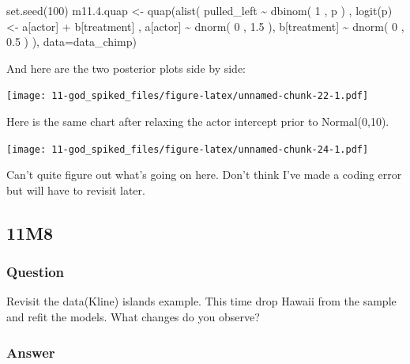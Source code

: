 \documentclass[
]{book}
\newenvironment{Shaded}{\begin{snugshade}}{\end{snugshade}}
\newcommand{\AttributeTok}[1]{\textcolor[rgb]{0.77,0.63,0.00}{#1}}
\newcommand{\DecValTok}[1]{\textcolor[rgb]{0.00,0.00,0.81}{#1}}
\newcommand{\FloatTok}[1]{\textcolor[rgb]{0.00,0.00,0.81}{#1}}
\newcommand{\FunctionTok}[1]{\textcolor[rgb]{0.00,0.00,0.00}{#1}}
\newcommand{\NormalTok}[1]{#1}
\newcommand{\OtherTok}[1]{\textcolor[rgb]{0.56,0.35,0.01}{#1}}
\newcommand{\SpecialCharTok}[1]{\textcolor[rgb]{0.00,0.00,0.00}{#1}}
\begin{document}
\begin{Shaded}
\begin{Highlighting}[]
\FunctionTok{set.seed}\NormalTok{(}\DecValTok{100}\NormalTok{)}
\NormalTok{m11.}\FloatTok{4.}\NormalTok{quap }\OtherTok{\textless{}{-}} \FunctionTok{quap}\NormalTok{(}\FunctionTok{alist}\NormalTok{( }
\NormalTok{  pulled\_left }\SpecialCharTok{\textasciitilde{}} \FunctionTok{dbinom}\NormalTok{( }\DecValTok{1}\NormalTok{ , p ) , }
  \FunctionTok{logit}\NormalTok{(p) }\OtherTok{\textless{}{-}}\NormalTok{ a[actor] }\SpecialCharTok{+}\NormalTok{ b[treatment] , }
\NormalTok{  a[actor] }\SpecialCharTok{\textasciitilde{}} \FunctionTok{dnorm}\NormalTok{( }\DecValTok{0}\NormalTok{ , }\FloatTok{1.5}\NormalTok{ ), }
\NormalTok{  b[treatment] }\SpecialCharTok{\textasciitilde{}} \FunctionTok{dnorm}\NormalTok{( }\DecValTok{0}\NormalTok{ , }\FloatTok{0.5}\NormalTok{ )}
\NormalTok{ ), }\AttributeTok{data=}\NormalTok{data\_chimp)}
\end{Highlighting}
\end{Shaded}

And here are the two posterior plots side by side:

\texttt{[image: 11-god\_spiked\_files/figure-latex/unnamed-chunk-22-1.pdf]}

Here is the same chart after relaxing the actor intercept prior to Normal(0,10).

\texttt{[image: 11-god\_spiked\_files/figure-latex/unnamed-chunk-24-1.pdf]}

Can't quite figure out what's going on here. Don't think I've made a coding error but will have to revisit later.

\hypertarget{m8}{%
\subsection*{11M8}\label{m8}}

\hypertarget{question-92}{%
\subsubsection*{Question}\label{question-92}}

Revisit the data(Kline) islands example. This time drop Hawaii from the sample and refit the models. What changes do you observe?

\hypertarget{answer-92}{%
\subsubsection*{Answer}\label{answer-92}}
\end{document}
